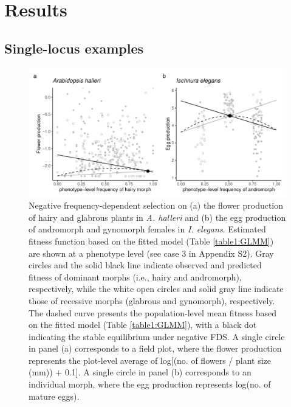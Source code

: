 \documentclass[12pt,]{article}
\begin{document}
\section{Results}

\subsection{Single-locus examples}

\begin{figure}[ht]
  \includegraphics[width=0.9\linewidth]{Ah_Ie_plots.pdf}
  \caption{Negative frequency-dependent selection on (a) the flower production of hairy and glabrous plants in \textit{A. halleri} and (b) the egg production of andromorph and gynomorph females in \textit{I. elegans}. Estimated fitness function based on the fitted model (Table \ref{table1:GLMM}) are shown at a phenotype level (see case 3 in Appendix S2). Gray circles and the solid black line indicate observed and predicted fitness of dominant morphs (i.e., hairy and andromorph), respectively, while the white open circles and solid gray line indicate those of recessive morphs (glabrous and gynomorph), respectively. The dashed curve presents the population-level mean fitness based on the fitted model (Table \ref{table1:GLMM}), with a black dot indicating the stable equilibrium under negative FDS. A single circle in panel (a) corresponds to a field plot, where the flower production represents the plot-level average of log[(no. of flowers / plant size (mm)) + 0.1]. A single circle in panel (b) corresponds to an individual morph, where the egg production represents log(no. of mature eggs).}
  \label{fig3:GLMM}
\end{figure}
\end{document}
